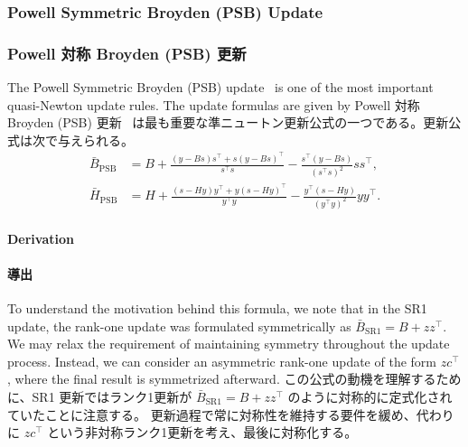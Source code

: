\documentclass[0_main]{subfiles}
\begin{document}
\ifEn
    \subsubsection{Powell Symmetric Broyden (PSB) Update}
\else
    \subsubsection{Powell 対称 Broyden (PSB) 更新}
\fi

\ifEn
    The Powell Symmetric Broyden (PSB) update~\cite{haeltermanAnalyticalStudyLeast2009} is one of the most important quasi-Newton update rules. The update formulas are given by
\else
    Powell 対称 Broyden (PSB) 更新~\cite{haeltermanAnalyticalStudyLeast2009} は最も重要な準ニュートン更新公式の一つである。更新公式は次で与えられる。
\fi
\begin{align*}
    \bar{B}_{\mathrm{PSB}} & = B + \frac{(y - B s) s^\top + s (y - B s)^\top}{s^\top s} - \frac{s^\top (y - B s)}{(s^\top s)^2} s s^\top, \\
    \bar{H}_{\mathrm{PSB}} & = H + \frac{(s - H y) y^\top + y (s - H y)^\top}{y^\top y} - \frac{y^\top (s - H y)}{(y^\top y)^2} y y^\top.
\end{align*}

\ifEn
    \paragraph{Derivation}
\else
    \paragraph{導出}
\fi

\ifEn
    To understand the motivation behind this formula, we note that in the SR1 update, the rank-one update was formulated symmetrically as $\bar{B}_{\mathrm{SR1}} = B + z z^\top$.
    We may relax the requirement of maintaining symmetry throughout the update process. Instead, we can consider an asymmetric rank-one update of the form $z c^\top$, where the final result is symmetrized afterward.
\else
    この公式の動機を理解するために、SR1 更新ではランク1更新が $\bar{B}_{\mathrm{SR1}} = B + z z^\top$ のように対称的に定式化されていたことに注意する。
    更新過程で常に対称性を維持する要件を緩め、代わりに $z c^\top$ という非対称ランク1更新を考え、最後に対称化する。
\fi
\end{document}

